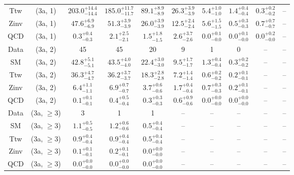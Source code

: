\begin{table}[h!]
{\begin{tabular}{cccccccccc}
	Ttw & (3a, 1) & $203.0^{+ 14.4 }_{- 14.4 }$ & $185.0^{+ 11.7 }_{- 11.7 }$ & $89.1^{+ 8.9 }_{- 8.9 }$ & $26.3^{+ 3.9 }_{- 3.9 }$ & $5.4^{+ 1.0 }_{- 1.0 }$ & $1.4^{+ 0.4 }_{- 0.4 }$ & $0.3^{+ 0.2 }_{- 0.2 }$ & -- \\[0.5ex] 
	Zinv & (3a, 1) & $47.6^{+ 6.9 }_{- 6.9 }$ & $51.3^{+ 3.9 }_{- 3.9 }$ & $26.0^{+ 3.9 }_{- 3.9 }$ & $12.5^{+ 2.4 }_{- 2.4 }$ & $5.6^{+ 1.5 }_{- 1.5 }$ & $0.5^{+ 0.3 }_{- 0.3 }$ & $0.7^{+ 0.7 }_{- 0.7 }$ & -- \\[0.5ex] 
	QCD & (3a, 1) & $0.3^{+ 0.4 }_{- 0.3 }$ & $2.1^{+ 2.5 }_{- 2.1 }$ & $1.5^{+ 1.8 }_{- 1.5 }$ & $2.6^{+ 3.7 }_{- 2.6 }$ & $0.0^{+ 0.1 }_{- 0.0 }$ & $0.0^{+ 0.1 }_{- 0.0 }$ & $0.0^{+ 0.2 }_{- 0.0 }$ & -- \\[0.5ex] 
	Data & (3a, 2) & 45 & 45 & 20 & 9 & 1 & 0 & -- & -- \\[0.5ex] 
	SM & (3a, 2) & $42.8^{+ 5.1 }_{- 5.1 }$ & $43.5^{+ 4.0 }_{- 4.0 }$ & $22.4^{+ 3.0 }_{- 3.0 }$ & $9.5^{+ 1.7 }_{- 1.7 }$ & $1.3^{+ 0.4 }_{- 0.4 }$ & $0.3^{+ 0.2 }_{- 0.2 }$ & -- & -- \\[0.5ex] 
	Ttw & (3a, 2) & $36.3^{+ 4.7 }_{- 4.7 }$ & $36.2^{+ 3.7 }_{- 3.7 }$ & $18.3^{+ 2.8 }_{- 2.8 }$ & $7.2^{+ 1.4 }_{- 1.4 }$ & $0.6^{+ 0.2 }_{- 0.2 }$ & $0.2^{+ 0.1 }_{- 0.1 }$ & -- & -- \\[0.5ex] 
	Zinv & (3a, 2) & $6.4^{+ 1.1 }_{- 1.1 }$ & $6.9^{+ 0.7 }_{- 0.7 }$ & $3.7^{+ 0.6 }_{- 0.6 }$ & $1.7^{+ 0.4 }_{- 0.4 }$ & $0.7^{+ 0.3 }_{- 0.3 }$ & $0.2^{+ 0.1 }_{- 0.1 }$ & -- & -- \\[0.5ex] 
	QCD & (3a, 2) & $0.1^{+ 0.1 }_{- 0.1 }$ & $0.4^{+ 0.5 }_{- 0.4 }$ & $0.3^{+ 0.3 }_{- 0.3 }$ & $0.6^{+ 0.9 }_{- 0.6 }$ & $0.0^{+ 0.0 }_{- 0.0 }$ & $0.0^{+ 0.0 }_{- 0.0 }$ & -- & -- \\[0.5ex] 
	Data & (3a, $\ge3$) & 3 & 1 & 1 & -- & -- & -- & -- & -- \\[0.5ex] 
	SM & (3a, $\ge3$) & $1.1^{+ 0.5 }_{- 0.5 }$ & $1.2^{+ 0.6 }_{- 0.6 }$ & $0.5^{+ 0.4 }_{- 0.4 }$ & -- & -- & -- & -- & -- \\[0.5ex] 
	Ttw & (3a, $\ge3$) & $0.9^{+ 0.4 }_{- 0.4 }$ & $0.9^{+ 0.4 }_{- 0.4 }$ & $0.5^{+ 0.4 }_{- 0.4 }$ & -- & -- & -- & -- & -- \\[0.5ex] 
	Zinv & (3a, $\ge3$) & $0.1^{+ 0.1 }_{- 0.1 }$ & $0.2^{+ 0.1 }_{- 0.1 }$ & $0.0^{+ 0.0 }_{- 0.0 }$ & -- & -- & -- & -- & -- \\[0.5ex] 
	QCD & (3a, $\ge3$) & $0.0^{+ 0.0 }_{- 0.0 }$ & $0.0^{+ 0.0 }_{- 0.0 }$ & $0.0^{+ 0.0 }_{- 0.0 }$ & -- & -- & -- & -- & -- \\[0.5ex] 

\end{tabular}}
\end{table}
